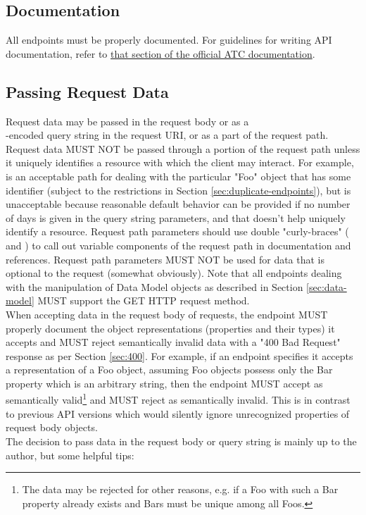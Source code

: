 \subsection{Documentation}
All endpoints must be properly documented. For guidelines for writing API documentation, refer to
\href{https://traffic-control-cdn.readthedocs.io/en/latest/development/documentation_guidelines.html#documenting-api-routes}{that section of the official ATC documentation}.

\subsection{Passing Request Data}
Request data may be passed in the request body or as a\\ -encoded query string in the request URI, or as a part of the
request path. Request data MUST NOT be passed through a portion of the request path unless it uniquely identifies a resource with which the client may
interact. For example,  is an acceptable path for dealing with the particular "Foo" object that has some identifier  (subject
to the restrictions in Section \ref{sec:duplicate-endpoints}), but  is unacceptable because reasonable default behavior can
be provided if no number of days is given in the query string parameters, and that doesn't help uniquely identify a resource. Request path parameters should
use double "curly-braces" (\code{\{} and \code{\}}) to call out variable components of the request path in documentation and references. Request path parameters
MUST NOT be used for data that is optional to the request (somewhat obviously). Note that all endpoints dealing with the manipulation of Data Model objects as
described in Section \ref{sec:data-model} MUST support the GET HTTP request method.\\
When accepting data in the request body of requests, the endpoint MUST properly
document the object representations (properties and their types) it accepts and
MUST reject semantically invalid data with a "400 Bad Request" response as per
Section \ref{sec:400}. For example, if an endpoint specifies it accepts a
representation of a Foo object, assuming Foo objects possess only the Bar
property which is an arbitrary string, then the endpoint MUST accept
 as semantically valid\footnote{The data may be
rejected for other reasons, e.g. if a Foo with such a Bar property already
exists and Bars must be unique among all Foos.} and MUST reject
 as semantically invalid.
This is in contrast to previous API versions which would silently ignore
unrecognized properties of request body objects.\\
The decision to pass data in the request body or query string is mainly up to the author, but some helpful tips:

